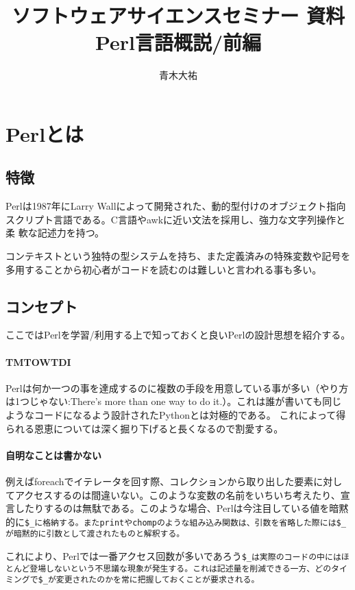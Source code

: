 \documentclass[a4paper,9pt]{jarticle}
\title{ソフトウェアサイエンスセミナー 資料 \\{\large{Perl言語概説/前編}}}
\author{青木大祐}
\begin{document}
\maketitle

\section{Perlとは}

\subsection{特徴}
Perlは1987年にLarry Wallによって開発された、動的型付けのオブジェクト指向
スクリプト言語である。C言語やawkに近い文法を採用し、強力な文字列操作と柔
軟な記述力を持つ。

コンテキストという独特の型システムを持ち、また定義済みの特殊変数や記号を
多用することから初心者がコードを読むのは難しいと言われる事も多い。

\subsection{コンセプト}
ここではPerlを学習/利用する上で知っておくと良いPerlの設計思想を紹介する。

\paragraph{TMTOWTDI}
Perlは何か一つの事を達成するのに複数の手段を用意している事が多い（やり方は1つじゃない:There's more than one way to do it.）。これは誰が書いても同じようなコードになるよう設計されたPythonとは対極的である。
これによって得られる恩恵については深く掘り下げると長くなるので割愛する。

\paragraph{自明なことは書かない}
例えばforeachでイテレータを回す際、コレクションから取り出した要素に対してアクセスするのは間違いない。このような変数の名前をいちいち考えたり、宣言したりするのは無駄である。このような場合、Perlは今注目している値を暗黙的に\tt{\$\_}に格納する。またprintやchompのような組み込み関数は、引数を省略した際には\tt{\$\_}が暗黙的に引数として渡されたものと解釈する。

これにより、Perlでは一番アクセス回数が多いであろう\tt{\$\_}は実際のコードの中にはほとんど登場しないという不思議な現象が発生する。これは記述量を削減できる一方、どのタイミングで\tt{\$\_}が変更されたのかを常に把握しておくことが要求される。
\end{document}
